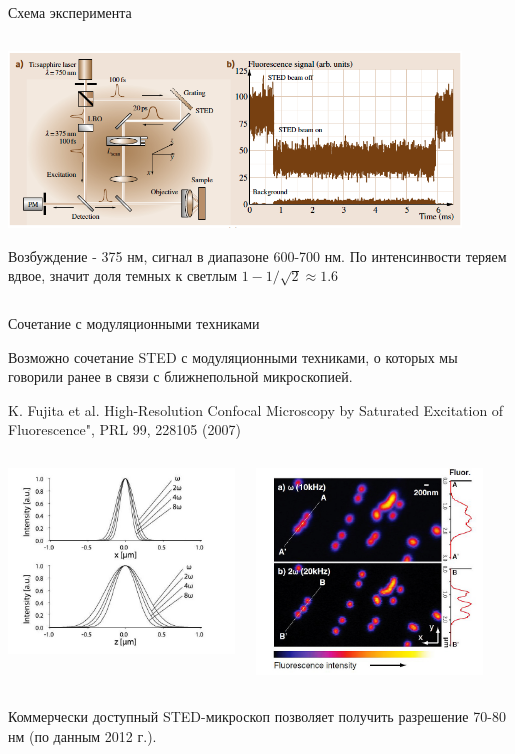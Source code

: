 \documentclass[9pt, compress, xcolor=table]{beamer}
\begin{document}
\begin{frame}{Схема эксперимента}
\begin{columns}[c]
\begin{center}
\begin{center}
\includegraphics[width=0.9\textwidth]{ffm03}
\end{center}
{\small Возбуждение - 375 нм, сигнал в диапазоне 600-700 нм. По интенсинвости теряем вдвое, значит доля темных к светлым $1-1/\sqrt{2}\approx 1.6$ }
\end{center}

\end{columns}

\end{frame}

\begin{frame}{Сочетание с модуляционными техниками}

Возможно сочетание STED с модуляционными техниками, о которых мы говорили ранее в связи с ближнепольной микроскопией.

K. Fujita et al. High-Resolution Confocal Microscopy by Saturated Excitation of Fluorescence", PRL 99, 228105 (2007)
\begin{columns}[c] 
\column{6cm}
\begin{center}
\includegraphics[width=6cm]{fig4_07e}
\end{center}

\column{6cm}
\begin{center}
\includegraphics[width=6cm]{fig4_07c}
\end{center}
\end{columns}
Коммерчески доступный STED-микроскоп позволяет получить разрешение 70-80 нм (по данным 2012 г.).
\end{frame}
\end{document}
